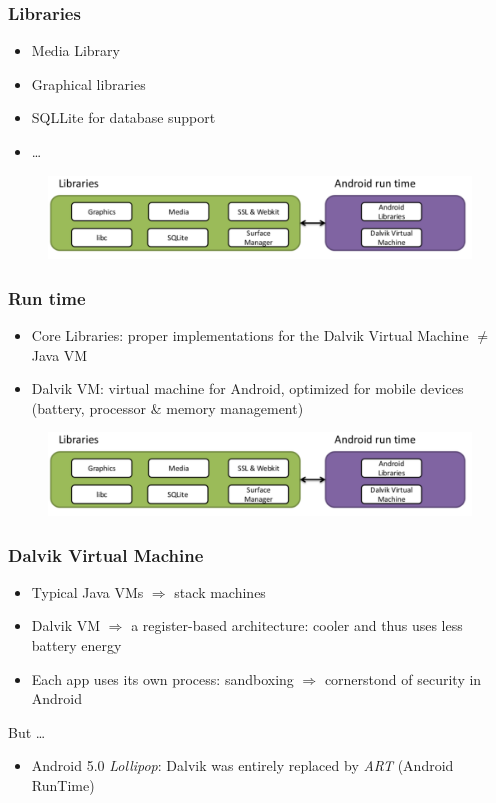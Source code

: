 \documentclass{beamer}
\begin{document}
\begin{frame}
\frametitle{Libraries}
\begin{itemize}
\item Media Library
\item Graphical libraries 
\item SQLLite for database support
\item \dots
\end{itemize}

\begin{figure}[b]
	\centering
		\includegraphics[width=\textwidth]{img/runtimeLibraries.pdf}
	\label{fig:kernel}
\end{figure}

\end{frame}

\begin{frame}
\frametitle{Run time}
\begin{itemize}
\item Core Libraries: proper implementations for the Dalvik Virtual Machine $\neq$ Java VM
\item Dalvik VM: virtual machine for Android, optimized for mobile devices (battery, processor \& memory management) 
\end{itemize}

\begin{figure}[b]
	\centering
		\includegraphics[width=\textwidth]{img/runtimeLibraries.pdf}
	\label{fig:kernel}
\end{figure}

\end{frame}

\begin{frame}
	\frametitle{Dalvik Virtual Machine}
	
	\begin{itemize}
		\item Typical Java VMs $\Rightarrow$ stack machines
		\item Dalvik VM $\Rightarrow$ a register-based architecture: cooler and thus uses less battery energy
		\item Each app uses its own process: sandboxing $\Rightarrow$ cornerstond of security in Android
	\end{itemize}
	\pause
	But \dots
	
	\begin{itemize}
		\item Android 5.0 \textit{Lollipop}: Dalvik was entirely replaced by \textsl{ART} (Android RunTime)
	\end{itemize}
\end{frame}
\end{document}
